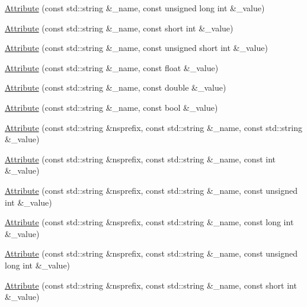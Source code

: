 \begin{DoxyCompactItemize}
\mbox{\hyperlink{classXMLWriterAPI_1_1Attribute_a4b58b92ec04b16aaeb474b481fc82f75}{Attribute}} (const std\+::string \&\+\_\+name, const unsigned long int \&\+\_\+value)
\item 
\mbox{\hyperlink{classXMLWriterAPI_1_1Attribute_a2a3505111016bd8236b31fd0fbd720ae}{Attribute}} (const std\+::string \&\+\_\+name, const short int \&\+\_\+value)
\item 
\mbox{\hyperlink{classXMLWriterAPI_1_1Attribute_ac22bdee50ed54fb2c0b15a447196f14b}{Attribute}} (const std\+::string \&\+\_\+name, const unsigned short int \&\+\_\+value)
\item 
\mbox{\hyperlink{classXMLWriterAPI_1_1Attribute_ab48d99233b83dddd0c8713b65a738e61}{Attribute}} (const std\+::string \&\+\_\+name, const float \&\+\_\+value)
\item 
\mbox{\hyperlink{classXMLWriterAPI_1_1Attribute_a48165cf6ffa29bc718542fdc81b98764}{Attribute}} (const std\+::string \&\+\_\+name, const double \&\+\_\+value)
\item 
\mbox{\hyperlink{classXMLWriterAPI_1_1Attribute_ad16e250869a26c1058a73cd9faef5d2f}{Attribute}} (const std\+::string \&\+\_\+name, const bool \&\+\_\+value)
\item 
\mbox{\hyperlink{classXMLWriterAPI_1_1Attribute_af62de63beb69186f082ce7f612514115}{Attribute}} (const std\+::string \&nsprefix, const std\+::string \&\+\_\+name, const std\+::string \&\+\_\+value)
\item 
\mbox{\hyperlink{classXMLWriterAPI_1_1Attribute_a9e412b0bd0a009de13ec17416e18e5b0}{Attribute}} (const std\+::string \&nsprefix, const std\+::string \&\+\_\+name, const int \&\+\_\+value)
\item 
\mbox{\hyperlink{classXMLWriterAPI_1_1Attribute_ab3fa4bff9a545a9ae37ea8abde138769}{Attribute}} (const std\+::string \&nsprefix, const std\+::string \&\+\_\+name, const unsigned int \&\+\_\+value)
\item 
\mbox{\hyperlink{classXMLWriterAPI_1_1Attribute_a3a90c7d66504a0d26098167ab29078f4}{Attribute}} (const std\+::string \&nsprefix, const std\+::string \&\+\_\+name, const long int \&\+\_\+value)
\item 
\mbox{\hyperlink{classXMLWriterAPI_1_1Attribute_a49838f6100d4c88ddca013872cfe0a1d}{Attribute}} (const std\+::string \&nsprefix, const std\+::string \&\+\_\+name, const unsigned long int \&\+\_\+value)
\item 
\mbox{\hyperlink{classXMLWriterAPI_1_1Attribute_a302d83b35d8e0ad1d36e6e98455e54b7}{Attribute}} (const std\+::string \&nsprefix, const std\+::string \&\+\_\+name, const short int \&\+\_\+value)

\end{DoxyCompactItemize}

